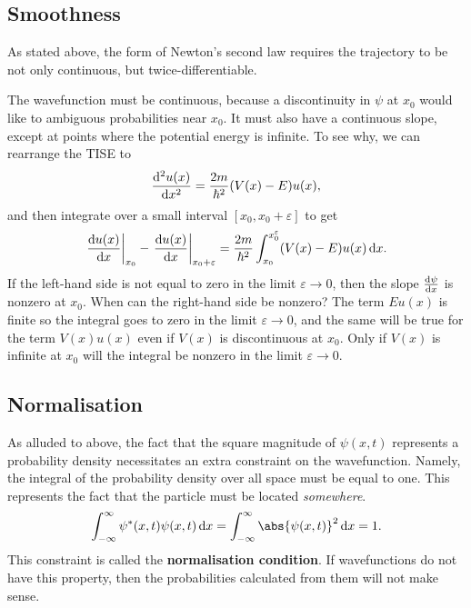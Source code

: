 \documentclass[../quantum_mechanics.tex]{subfiles}
\begin{document}
        \subsection{Smoothness}\label{sec:conditions-for-valid-wavefunctions:subsec:smoothness}
            As stated above, the form of Newton's second law requires the trajectory to be not only continuous, but twice-differentiable.

            The wavefunction must be continuous, because a discontinuity in $\psi$ at $x_0$ would like to ambiguous probabilities near $x_0$.
            It must also have a continuous slope, except at points where the potential energy is infinite.
            To see why, we can rearrange the TISE to
            \begin{equation}
                \dv[2]{u(x)}{x}=\frac{2m}{\hbar^2}(V(x)-E)u(x),
            \end{equation}
            and then integrate over a small interval $[x_0,x_0+\varepsilon]$ to get
            \begin{equation}
                \left.\dv{u(x)}{x}\right|_{x_0}-\left.\dv{u(x)}{x}\right|_{x_0+\varepsilon}=\frac{2m}{\hbar^2}\int_{x_0}^{x_0^\varepsilon}(V(x)-E)u(x)\dd{x}.
            \end{equation}
            If the left-hand side is not equal to zero in the limit $\varepsilon\to 0$, then the slope $\dv{\psi}{x}$ is nonzero at $x_0$.
            When can the right-hand side be nonzero?
            The term $Eu(x)$ is finite so the integral goes to zero in the limit $\varepsilon\to 0$, and the same will be true for the term $V(x)u(x)$ even if $V(x)$ is discontinuous at $x_0$.
            Only if $V(x)$ is infinite at $x_0$ will the integral be nonzero in the limit $\varepsilon\to 0$.

        \subsection{Normalisation}\label{sec:conditions-for-valid-wavefunctions:subsec:normalisation}
            As alluded to above, the fact that the square magnitude of $\psi(x,t)$ represents a probability density necessitates an extra constraint on the wavefunction.
            Namely, the integral of the probability density over all space must be equal to one.
            This represents the fact that the particle must be located \textit{somewhere}.
            \begin{equation}
                \int_{-\infty}^\infty\psi^\ast(x,t)\psi(x,t)\dd{x}=\int_{-\infty}^\infty\abs{\psi(x,t)}^2\dd{x}=1.
            \end{equation}
            This constraint is called the \textbf{normalisation condition}.
            If wavefunctions do not have this property, then the probabilities calculated from them will not make sense.
\end{document}
